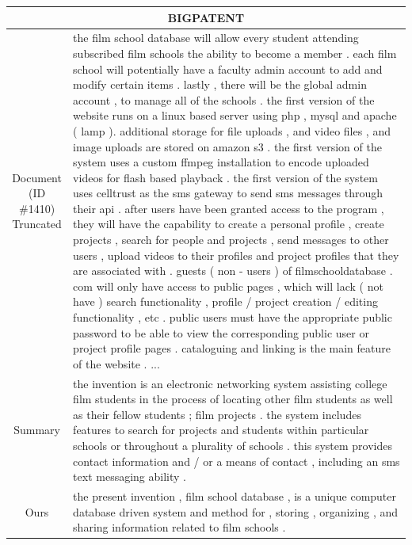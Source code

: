 \begin{table}[h!]
\scriptsize
  \centering
  \renewcommand{\arraystretch}{1.3}
  \begin{tabular}{c|p{}}
  \hline
  \multicolumn{2}{c}{BIGPATENT} \\ \hline
  \makecell{Document\\(ID \#1410)\\Truncated} &  the film school database will allow every student attending subscribed film schools the ability to become a member . each film school will potentially have a faculty admin account to add and modify certain items . lastly , there will be the global admin account , to manage all of the schools . the first version of the website runs on a linux based server using php , mysql and apache ( lamp ). additional storage for file uploads , and video files , and image uploads are stored on amazon s3 . the first version of the system uses a custom ffmpeg installation to encode uploaded videos for flash based playback . the first version of the system uses celltrust as the sms gateway to send sms messages through their api . after users have been granted access to the program , they will have the capability to create a personal profile , create projects , search for people and projects , send messages to other users , upload videos to their profiles and project profiles that they are associated with . guests ( non - users ) of filmschooldatabase . com will only have access to public pages , which will lack ( not have ) search functionality , profile / project creation / editing functionality , etc . public users must have the appropriate   public password   to be able to view the corresponding public user or project profile pages . cataloguing and linking is the main feature of the website . ... \\\hline
  Summary & the invention is an electronic networking system assisting college   film students   in the process of locating other film students as well as their fellow students ; film projects . the system includes features to search for projects and students within particular schools or throughout a plurality of schools . this system provides contact information and / or a means of contact , including an sms text messaging ability . \\\hline
  Ours & the present invention , film school database , is a unique computer database driven system and method for , storing , organizing , and sharing information related to film schools .\\\hline
  

\end{tabular}
\end{table}
